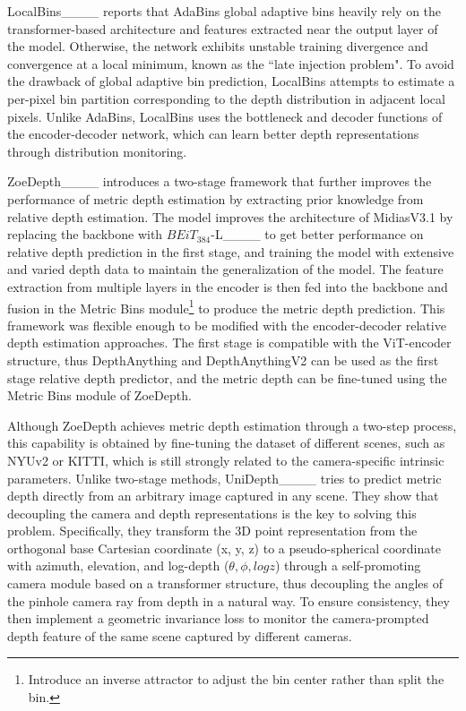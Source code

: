 LocalBins____ reports that AdaBins global adaptive bins heavily rely on the transformer-based architecture and features extracted near the output layer of the model. Otherwise, the network exhibits unstable training divergence and convergence at a local minimum, known as the ``late injection problem". To avoid the drawback of global adaptive bin prediction, LocalBins attempts to estimate a per-pixel bin partition corresponding to the depth distribution in adjacent local pixels. Unlike AdaBins, LocalBins uses the bottleneck and decoder functions of the encoder-decoder network, which can learn better depth representations through distribution monitoring.

ZoeDepth____ introduces a two-stage framework that further improves the performance of metric depth estimation by extracting prior knowledge from relative depth estimation. The model improves the architecture of MidiasV3.1 by replacing the backbone with $BEiT_{384}$-L____ to get better performance on relative depth prediction in the first stage, and training the model with extensive and varied depth data to maintain the generalization of the model. The feature extraction from multiple layers in the encoder is then fed into the backbone and fusion in the Metric Bins module\footnote{Introduce an inverse attractor to adjust the bin center rather than split the bin.} to produce the metric depth prediction. This framework was flexible enough to be modified with the encoder-decoder relative depth estimation approaches. The first stage is compatible with the ViT-encoder structure, thus DepthAnything and DepthAnythingV2 can be used as the first stage relative depth predictor, and the metric depth can be fine-tuned using the Metric Bins module of ZoeDepth.

Although ZoeDepth achieves metric depth estimation through a two-step process, this capability is obtained by fine-tuning the dataset of different scenes, such as NYUv2 or KITTI, which is still strongly related to the camera-specific intrinsic parameters. Unlike two-stage methods, UniDepth____ tries to predict metric depth directly from an arbitrary image captured in any scene. They show that decoupling the camera and depth representations is the key to solving this problem. Specifically, they transform the 3D point representation from the orthogonal base Cartesian coordinate (x, y, z) to a pseudo-spherical coordinate with azimuth, elevation, and log-depth ($\theta, \phi, logz$) through a self-promoting camera module based on a transformer structure, thus decoupling the angles of the pinhole camera ray from depth in a natural way. To ensure consistency, they then implement a geometric invariance loss to monitor the camera-prompted depth feature of the same scene captured by different cameras.

